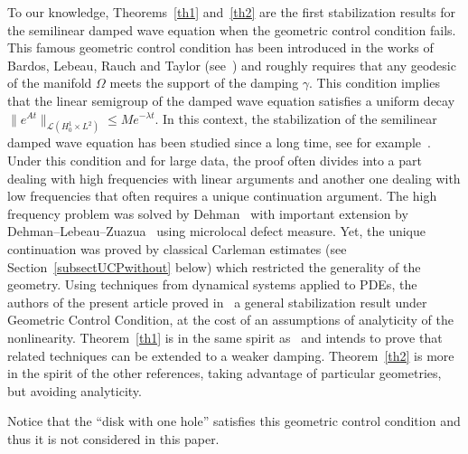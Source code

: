 \documentclass[AHL,Unicode,longabstracts]{cedram}
\newcommand{\Lc}{\mathcal{L}}
\begin{document}


To our knowledge, Theorems~\ref{th1} and~\ref{th2} are the first stabilization results for the semilinear damped wave equation when the geometric control condition fails. This famous geometric control condition has been introduced in the works of Bardos, Lebeau, Rauch and Taylor (see~\cite{BLR}) and roughly requires that any geodesic of the manifold $\Omega$ meets the support of the damping $\gamma$. This condition implies that the linear semigroup of the damped wave equation satisfies a uniform decay $\|e^{At}\|_{\Lc(H^1_0\times L^2)}\leq Me^{-\lambda t}$. In this context, the stabilization of the semilinear damped wave equation has been studied since a long time, see for example~\cite{Dehman,DLZ,Haraux,RC, Zuazua}. Under this condition and for large data, the proof often divides into a part dealing with high frequencies with linear arguments and another one dealing with low frequencies that often requires a unique continuation argument. The high frequency problem was solved by Dehman~\cite{Dehman} with important extension by Dehman--Lebeau--Zuazua~\cite{DLZ} using microlocal defect measure. Yet, the unique continuation was proved by classical Carleman estimates (see Section~\ref{subsectUCPwithout} below) which restricted the generality of the geometry. Using techniques from dynamical systems applied to PDEs, the authors of the present article proved in~\cite{RC} a general stabilization result under Geometric Control Condition, at the cost of an assumptions of analyticity of the nonlinearity. Theorem~\ref{th1} is in the same spirit as~\cite{RC} and intends to prove that related techniques can be extended to a weaker damping. Theorem~\ref{th2} is more in the spirit of the other references, taking advantage of particular geometries, but avoiding analyticity.


Notice that the ``disk with one hole'' satisfies this geometric control condition and thus it is not considered in this paper.
\end{document}
